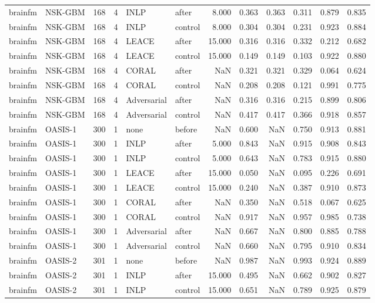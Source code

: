\begin{tabular}{llrrllrrrrrr}
brainfm & NSK-GBM & 168 & 4 & INLP & after & 8.000 & 0.363 & 0.363 & 0.311 & 0.879 & 0.835 \\
brainfm & NSK-GBM & 168 & 4 & INLP & control & 8.000 & 0.304 & 0.304 & 0.231 & 0.923 & 0.884 \\
brainfm & NSK-GBM & 168 & 4 & LEACE & after & 15.000 & 0.316 & 0.316 & 0.332 & 0.212 & 0.682 \\
brainfm & NSK-GBM & 168 & 4 & LEACE & control & 15.000 & 0.149 & 0.149 & 0.103 & 0.922 & 0.880 \\
brainfm & NSK-GBM & 168 & 4 & CORAL & after & NaN & 0.321 & 0.321 & 0.329 & 0.064 & 0.624 \\
brainfm & NSK-GBM & 168 & 4 & CORAL & control & NaN & 0.208 & 0.208 & 0.121 & 0.991 & 0.775 \\
brainfm & NSK-GBM & 168 & 4 & Adversarial & after & NaN & 0.316 & 0.316 & 0.215 & 0.899 & 0.806 \\
brainfm & NSK-GBM & 168 & 4 & Adversarial & control & NaN & 0.417 & 0.417 & 0.366 & 0.918 & 0.857 \\
brainfm & OASIS-1 & 300 & 1 & none & before & NaN & 0.600 & NaN & 0.750 & 0.913 & 0.881 \\
brainfm & OASIS-1 & 300 & 1 & INLP & after & 5.000 & 0.843 & NaN & 0.915 & 0.908 & 0.843 \\
brainfm & OASIS-1 & 300 & 1 & INLP & control & 5.000 & 0.643 & NaN & 0.783 & 0.915 & 0.880 \\
brainfm & OASIS-1 & 300 & 1 & LEACE & after & 15.000 & 0.050 & NaN & 0.095 & 0.226 & 0.691 \\
brainfm & OASIS-1 & 300 & 1 & LEACE & control & 15.000 & 0.240 & NaN & 0.387 & 0.910 & 0.873 \\
brainfm & OASIS-1 & 300 & 1 & CORAL & after & NaN & 0.350 & NaN & 0.518 & 0.067 & 0.625 \\
brainfm & OASIS-1 & 300 & 1 & CORAL & control & NaN & 0.917 & NaN & 0.957 & 0.985 & 0.738 \\
brainfm & OASIS-1 & 300 & 1 & Adversarial & after & NaN & 0.667 & NaN & 0.800 & 0.885 & 0.788 \\
brainfm & OASIS-1 & 300 & 1 & Adversarial & control & NaN & 0.660 & NaN & 0.795 & 0.910 & 0.834 \\
brainfm & OASIS-2 & 301 & 1 & none & before & NaN & 0.987 & NaN & 0.993 & 0.924 & 0.889 \\
brainfm & OASIS-2 & 301 & 1 & INLP & after & 15.000 & 0.495 & NaN & 0.662 & 0.902 & 0.827 \\
brainfm & OASIS-2 & 301 & 1 & INLP & control & 15.000 & 0.651 & NaN & 0.789 & 0.925 & 0.879 \\

\end{tabular}
